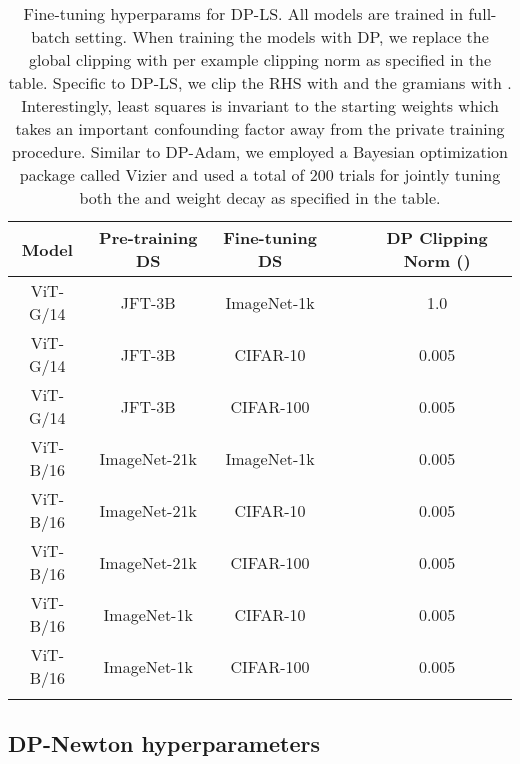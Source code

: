 \documentclass[letterpaper]{article} \usepackage{fullpage}
\begin{document}
\begin{table}[H]
    \centering
\label{tab:hparams_lamb}
    \begin{tabular}{cccccc}
    \toprule
        Model & Pre-training DS & Fine-tuning DS &  &  & DP Clipping Norm ()   \\
        \midrule
      ViT-G/14 & JFT-3B & ImageNet-1k &  &  & 1.0 \\
           ViT-G/14 & JFT-3B & CIFAR-10 &  &  & 0.005 \\
      ViT-G/14 & JFT-3B & CIFAR-100 &  &  & 0.005 \\
      ViT-B/16 & ImageNet-21k & ImageNet-1k &  &  & 0.005 \\
      ViT-B/16 & ImageNet-21k & CIFAR-10 &  &  & 0.005 \\
      ViT-B/16 & ImageNet-21k & CIFAR-100 &  &  & 0.005 \\
           ViT-B/16 & ImageNet-1k & CIFAR-10 &  &  & 0.005 \\
      ViT-B/16 & ImageNet-1k & CIFAR-100 &  &  & 0.005 \\
         \bottomrule
         \addlinespace[0.3cm]
    \end{tabular}
        \caption{Fine-tuning hyperparams for DP-LS. All models are trained in full-batch setting. When training the models with DP, we replace the global clipping with per example clipping norm as specified in the table. Specific to DP-LS, we clip the RHS with  and the gramians with . Interestingly, least squares is invariant to the starting weights which takes an important confounding factor away from the private training procedure. Similar to DP-Adam, we employed a Bayesian optimization package called Vizier \citep{vizier, oss_vizier} and used a total of 200 trials for jointly tuning both the  and weight decay as specified in the table.}
\end{table}


\subsection{DP-Newton hyperparameters}
\end{document}
